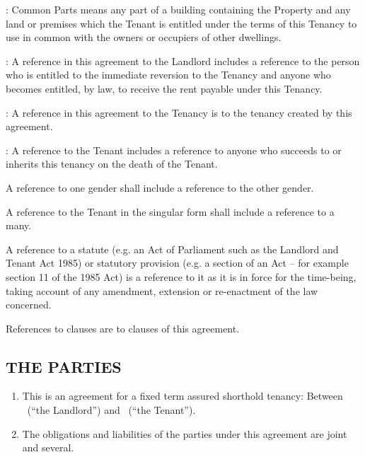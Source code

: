 \begin{description}\itemsep2pt
\item[Common Parts]: Common Parts means any part of a building containing
the Property and any land or premises which the Tenant is entitled under
the terms of this Tenancy to use in common with the owners or occupiers
of other dwellings.

\item[Landlord]: A reference in this agreement to the Landlord includes a
reference to the person who is entitled to the immediate reversion to
the Tenancy and anyone who becomes entitled, by law, to receive the rent
payable under this Tenancy.

\item[Tenancy]: A reference in this agreement to the Tenancy is to the tenancy created by this agreement.

\item[Tenant]: A reference to the Tenant includes a reference to anyone who succeeds to or inherits this tenancy on the death of the Tenant.

\item A reference to one gender shall include a reference to the other gender.

\item A reference to the Tenant in the singular form shall include a reference to a many.

\item A reference to a statute (e.g. an Act of Parliament such as the Landlord and Tenant Act 1985) or statutory provision (e.g. a section of an Act – for example section 11 of the 1985 Act) is a reference to it as it is in force for the time-being, taking account of any amendment, extension or re-enactment of the law concerned.

\item References to clauses are to clauses of this agreement.

\end{description}

\subsection{THE PARTIES}

\begin{enumerate}
\item{This is an agreement for a fixed term assured shorthold tenancy: Between \Landlord\ (``the Landlord'') and \Tenant\ (``the Tenant'').}

\item{The obligations and liabilities of the parties under this agreement are joint and several.}
\end{enumerate}

